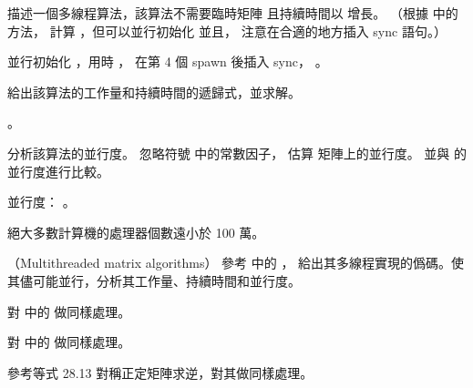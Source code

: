 \startigBase[a]\startitem
描述一個多線程算法，該算法不需要臨時矩陣  且持續時間以  增長。
（\hint 根據  中的方法，
計算 ，但可以並行初始化  並且，
注意在合適的地方插入 sync 語句。）
\stopitem\stopigBase

\startANSWER
並行初始化 ，用時 ，
在第 4 個 spawn  後插入 sync，
 。
\stopANSWER

\startigBase[continue]\startitem
給出該算法的工作量和持續時間的遞歸式，並求解。
\stopitem\stopigBase

\startANSWER
{}。
\stopANSWER

\startigBase[continue]\startitem
分析該算法的並行度。
忽略符號 \m{\Theta} 中的常數因子，
估算  矩陣上的並行度。
並與  的並行度進行比較。
\stopitem\stopigBase

\startANSWER
並行度： 。

絕大多數計算機的處理器個數遠小於 100 萬。
\stopANSWER
\stopPROBLEM

\startPROBLEM
（Multithreaded matrix algorithms）
\startigBase[a]\startitem
參考 中的 ，
給出其多線程實現的僞碼。使其儘可能並行，分析其工作量、持續時間和並行度。
\stopitem\stopigBase

\startANSWER
{}
\stopANSWER

\startigBase[continue]\startitem
對 中的  做同樣處理。
\stopitem\stopigBase
\stopPROBLEM

\startANSWER
{}
\stopANSWER

\startigBase[continue]\startitem
對 中的  做同樣處理。
\stopitem\stopigBase

\startANSWER
{}
\stopANSWER

\startigBase[continue]\startitem
參考等式 28.13 對稱正定矩陣求逆，對其做同樣處理。
\stopitem\stopigBase

\startANSWER
{}
\stopANSWER
\stopPROBLEM

\stopsubject%
